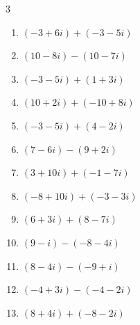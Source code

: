 \begin{multicols}{3}
\begin{enumerate}
        \phantom{$\displaystyle =-18+i$}

  \item $\displaystyle (-3+6i) + (-3-5i)$

        \phantom{$\displaystyle =-6+i$}

  \item $\displaystyle (10-8i) - (10-7i)$

        \phantom{$\displaystyle =-i$}

  \item $\displaystyle (-3-5i) + (1+3i)$

        \phantom{$\displaystyle =-2-2i$}

  \item $\displaystyle (10+2i) + (-10+8i)$

        \phantom{$\displaystyle =10i$}

  \item $\displaystyle (-3-5i) + (4-2i)$

        \phantom{$\displaystyle =1-7i$}

  \item $\displaystyle (7-6i) - (9+2i)$

        \phantom{$\displaystyle =-2-8i$}

  \item $\displaystyle (3+10i) + (-1-7i)$

        \phantom{$\displaystyle =2+3i$}

\columnbreak %

  \item $\displaystyle (-8+10i) + (-3-3i)$

        \phantom{$\displaystyle =-11+7i$}

  \item $\displaystyle (6+3i) + (8-7i)$

        \phantom{$\displaystyle =14-4i$}

  \item $\displaystyle (9-i) - (-8-4i)$

        \phantom{$\displaystyle =17+3i$}

  \item $\displaystyle (8-4i) - (-9+i)$

        \phantom{$\displaystyle =17-5i$}

  \item $\displaystyle (-4+3i) - (-4-2i)$

        \phantom{$\displaystyle =5i$}

  \item $\displaystyle (8+4i) + (-8-2i)$


\end{enumerate}
\end{multicols}
